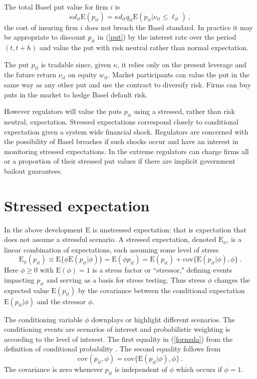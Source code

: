 \documentclass[authoryear]{elsarticle}
\newcommand{\E}{\mathrm{E}}
\newcommand{\cov}{\mathrm{cov}}
\newcommand{\Es}{\E_\phi}
\newcommand{\eref}[1]{(\ref{#1})}
\newcommand{\be}[1]{\begin{equation}\label{#1}}
\newcommand{\ee}{\end{equation}}
\begin{document}
The total Basel put value  for firm  $i$ is   
$$
\kappa d_{it}\E(p_{it}) = \kappa d_{it}q_{it}\E(p_{it}|\nu_{it}\le \ell_{it})\ ,
$$
the cost of insuring firm $i$ does not breach the Basel standard.  In practice it may be appropriate to discount $p_{it}$ in \eref{put} by the interest rate over the period $(t,t+h)$ and value the put with risk neutral rather than normal expectation.       

The put $p_{it}$ is tradable since, given $\kappa$, it relies only on the present leverage and the future return $\nu_{it}$ on equity $w_{it}$.  Market participants can value the put in  the same way as any other put and use the contract to diversify risk.  Firms can buy puts in the market to hedge Basel default risk.    

However regulators will value the puts $p_{it}$ using a stressed, rather than risk neutral, expectation.   Stressed expectations correspond closely to conditional expectation given a system wide financial shock.    Regulators are concerned with the possibility of Basel breaches if such shocks occur and  have an  interest in monitoring stressed expectations.   In the extreme regulators can charge firms all or a  proportion of their stressed put values if there are implicit government bailout guarantees.


\section{Stressed expectation}

In the above development $\E$  is  unstressed expectation:  that is expectation that does not assume a stressful scenario.   A stressed expectation, denoted $\Es$, is a
linear combination of  expectations, each assuming some level of stress
\be{formula}
 \Es(p_{it}) \equiv \E\{\phi\E(p_{it}|\phi)\} = \E(\phi p_{it}) = \E(p_{it}) + \cov\{\E(p_{it}|\phi),\phi\}\ .
\ee 
Here $\phi\ge 0$ with $\E(\phi)=1$ is a stress factor or ``stressor,"  defining events impacting $p_{it}$  and serving as a basis for stress testing.  Thus stress $\phi$ changes the expected value $\E(p_{it})$ by the covariance between the conditional expectation $\E(p_{it}|\phi)$  and the stressor $\phi$.

The conditioning variable $\phi$  downplays or highlight different scenarios.  The conditioning events are scenarios of interest and  probabilistic weighting is according to the level of interest.  The first equality in \eref{formula}  from the definition of conditional probability \citep{whittle2000probability}.  The second equality follows from
$$
\cov(p_{it},\phi)=\cov\{\E(p_{it}|\phi),\phi\}\ .
$$
The covariance is zero whenever  $p_{it}$ is independent of $\phi$ which occurs if $\phi=1$.
\end{document}
